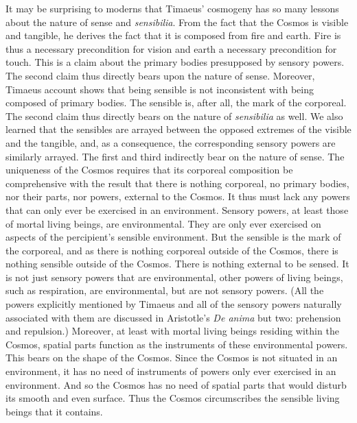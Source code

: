 It may be surprising to moderns that Timaeus' cosmogeny has so many lessons about the nature of sense and \emph{sensibilia}. From the fact that the Cosmos is visible and tangible, he derives the fact that it is composed from fire and earth. Fire is thus a necessary precondition for vision and earth a necessary precondition for touch. This is a claim about the primary bodies presupposed by sensory powers. The second claim thus  directly bears upon the nature of sense. Moreover, Timaeus account shows that being sensible is not inconsistent with being composed of primary bodies. The sensible is, after all, the mark of the corporeal. The second claim thus directly bears on the nature of \emph{sensibilia} as well. We also learned that the sensibles are arrayed between the opposed extremes of the visible and the tangible, and, as a consequence, the corresponding sensory powers are similarly arrayed. The first and third indirectly bear on the nature of sense. The uniqueness of the Cosmos requires that its corporeal composition be comprehensive with the result that there is nothing corporeal, no primary bodies, nor their parts, nor powers, external to the Cosmos. It thus must lack any powers that can only ever be exercised in an environment. Sensory powers, at least those of mortal living beings, are environmental. They are only ever exercised on aspects of the percipient's sensible environment. But the sensible is the mark of the corporeal, and as there is nothing corporeal outside of the Cosmos, there is nothing sensible outside of the Cosmos. There is nothing external to be sensed. It is not just sensory powers that are environmental, other powers of living beings, such as respiration, are environmental, but are not sensory powers. (All the powers explicitly mentioned by Timaeus and all of the sensory powers naturally associated with them are discussed in Aristotle's \emph{De anima} but two: prehension and repulsion.) Moreover, at least with mortal living beings residing within the Cosmos, spatial parts function as the instruments of these environmental powers. This bears on the shape of the Cosmos. Since the Cosmos is not situated in an environment, it has no need of instruments of powers only ever exercised in an environment. And so the Cosmos has no need of spatial parts that would disturb its smooth and even surface. Thus the Cosmos circumscribes the sensible living beings that it contains.



